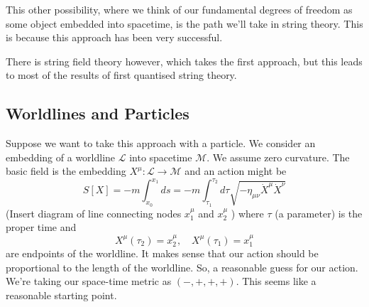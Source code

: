 \documentclass[11pt, oneside]{article}   	%
\theoremstyle{slanted}
\begin{document}
This other possibility, 
where we think of our fundamental degrees of 
freedom as some object embedded into spacetime, 
is the path we'll take in string theory. 
This is because this approach has been very successful. 

There is string field theory however, which takes the first 
approach, but this leads to most of the results 
of first quantised string theory. 

\subsection{Worldlines and Particles}
Suppose we want to take this approach 
with a particle. 
We consider an embedding 
of a worldline $ \mathcal{ L } $ 
into spacetime $ \mathcal{ M } $. 
We assume zero curvature. 
The basic field is the embedding $ X ^ \mu : 
\mathcal{ L } \to \mathcal{ M } $ 
and an action might be 
\[
 S \left[  X  \right]   =  -m \int _{ x_0 } ^{ x_1 } ds  =  -m 
 \int_{ \tau_1 }^{ \tau_2 } d \tau \sqrt{  - \eta _{ \mu \nu } \dot{ X  }^ \mu \dot{  X} ^ \nu   } 
\] (Insert diagram of line connecting nodes $ x_ 1 ^ \mu $ and $ x _ 2 ^ \mu $  )
where $ \tau $ (a parameter) is the proper time 
and 
\[
	X ^ \mu \left( \tau _ 2  \right)   =  x _ 2 ^ \mu , \quad X ^ \mu \left( \tau _ 1  \right)   = x_1 ^ \mu  
\] are endpoints of the worldline. 
It makes sense 
that our action 
should be proportional to 
the length of the worldline. 
So, a reasonable guess for our action. 
We're taking our space-time metric as $ \left(  -, + , + , +  \right)  $. 
This seems like a reasonable starting point. 
\end{document}
